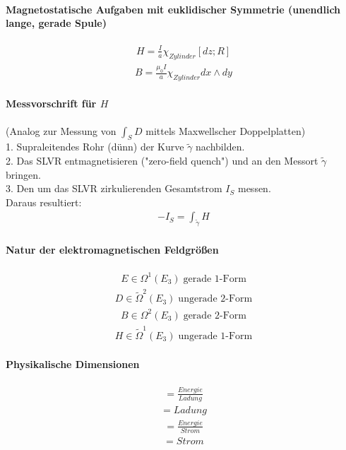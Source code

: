 \documentclass[10pt,a4paper]{article}
\begin{document}
\paragraph{Magnetostatische Aufgaben mit euklidischer Symmetrie (unendlich lange, gerade Spule)} $\,$ \\
\begin{align}
H= \frac{I}{a} \chi_{Zylinder} [dz;R]
\end{align}
\begin{align}
B= \frac{\mu_0 I}{a} \chi_{Zylinder} dx \wedge dy
\end{align}
\paragraph{Messvorschrift für $H$} $\,$ \\
(Analog zur Messung von $ \int_S D $ mittels Maxwellscher Doppelplatten) \\
1. Supraleitendes Rohr (dünn) der Kurve $ \tilde{\gamma} $ nachbilden.\\
2. Das SLVR entmagnetisieren ("zero-field quench") und an den Messort $\tilde{\gamma} $ bringen. \\
3. Den um das SLVR zirkulierenden Gesamtstrom $I_S$ messen. \\
Daraus resultiert:
\begin{align}
-I_S=\int_{\tilde{\gamma}} H
\end{align}
\paragraph{Natur der elektromagnetischen Feldgrößen} $\,$ \\
\begin{align}
E \in \Omega^1 (E_3) \; \text{gerade 1-Form}
\end{align}
\begin{align}
D \in \tilde{\Omega}^2(E_3) \; \text{ungerade 2-Form}
\end{align}
\begin{align}
B \in \Omega^2 (E_3) \; \text{gerade 2-Form}
\end{align}
\begin{align}
H \in \tilde{\Omega}^1(E_3) \; \text{ungerade 1-Form}
\end{align}
\paragraph{Physikalische Dimensionen}
\begin{align}
[E]= \frac{Energie}{Ladung}
\end{align}
\begin{align}
[D]= Ladung
\end{align}
\begin{align}
[B]= \frac{Energie}{Strom}
\end{align}
\begin{align}
[H]= Strom
\end{align}
\end{document}
